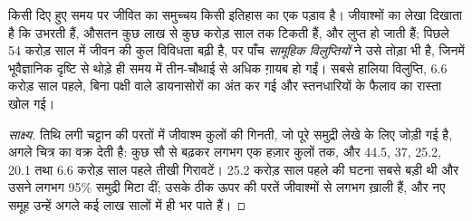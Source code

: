 \begin{proposition}[जैव विविधता एक अवस्था है, कोई स्थिरांक नहीं]\label{prop:g10:biodiversity-scales:changes}
किसी दिए हुए समय पर जीवित  का समुच्चय किसी इतिहास का एक पड़ाव
है। जीवाश्मों का लेखा दिखाता है कि  उभरती हैं, औसतन कुछ लाख से
कुछ करोड़ साल तक टिकती हैं, और लुप्त हो जाती हैं; पिछले 54 करोड़ साल में
जीवन की कुल विविधता बढ़ी है, पर पाँच
\emph{सामूहिक विलुप्तियों} ने उसे तोड़ा भी है,
जिनमें भूवैज्ञानिक दृष्टि से थोड़े ही समय में तीन-चौथाई से अधिक
 ग़ायब हो गईं। सबसे हालिया विलुप्ति, 6.6 करोड़ साल पहले, बिना
पक्षी वाले डायनासोरों का अंत कर गई और स्तनधारियों के फैलाव का रास्ता खोल
गई।
\end{proposition}
\begin{proof}[साक्ष्य]
तिथि लगी चट्टान की परतों में जीवाश्म कुलों की गिनती, जो पूरे समुद्री लेखे
के लिए जोड़ी गई है, अगले चित्र का वक्र देती है: कुछ सौ से बढ़कर लगभग एक
हज़ार कुलों तक, और 44.5, 37, 25.2, 20.1 तथा 6.6 करोड़ साल पहले तीखी
गिरावटें। 25.2 करोड़ साल पहले की घटना सबसे बड़ी थी और उसने लगभग 95\%
समुद्री  मिटा दीं; उसके ठीक ऊपर की परतें जीवाश्मों से लगभग
ख़ाली हैं, और नए समूह उन्हें अगले कई लाख सालों में ही भर पाते हैं।
\end{proof}

